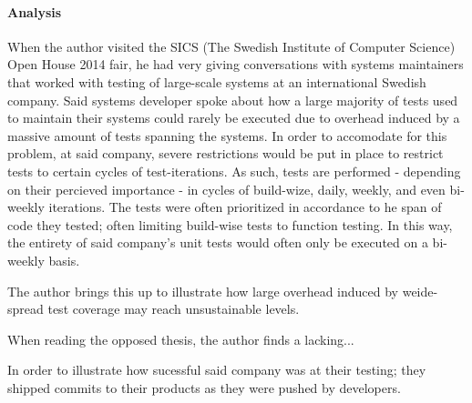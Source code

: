 
\paragraph{Analysis}
\label{par:analysis}
When the author visited the SICS (The Swedish Institute of Computer Science) Open House 2014 fair, he had very giving conversations with systems maintainers that worked with testing of large-scale systems at an international Swedish company.
Said systems developer spoke about how a large majority of tests used to maintain their systems could rarely be executed due to overhead induced by a massive amount of tests spanning the systems.
In order to accomodate for this problem, at said company, severe restrictions would be put in place to restrict tests to certain cycles of test-iterations.
As such, tests are performed - depending on their percieved importance - in cycles of build-wize, daily, weekly, and even bi-weekly iterations.
The tests were often prioritized in accordance to he span of code they tested; often limiting build-wise tests to function testing.
In this way, the entirety of said company's unit tests would often only be executed on a bi-weekly basis.

The author brings this up to illustrate how large overhead induced by weide-spread test coverage may reach unsustainable levels. 

When reading the opposed thesis, the author finds a lacking...

In order to illustrate how sucessful said company was at their testing; they shipped commits to their products as they were pushed by developers.




